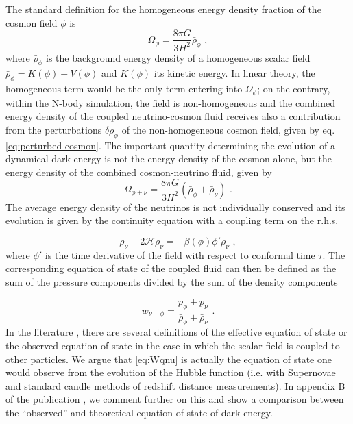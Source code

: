 The standard definition for the homogeneous energy density fraction
of the cosmon field $\phi$ is 
\begin{equation}
\Omega_{\phi}=\frac{8\pi G}{3H^{2}}\bar{\rho}_{\phi}\,\,,
\end{equation}
where $\bar{\rho}_{\phi}$ is the background energy density of a homogeneous
scalar field $\bar{\rho}_{\phi}=K(\phi)+V(\phi)$ and $K(\phi)$ its
kinetic energy. In linear theory, the homogeneous term would be the
only term entering into $\Omega_{\phi}$; on the contrary, within
the N-body simulation, the field is non-homogeneous and the combined
energy density of the coupled neutrino-cosmon fluid receives also
a contribution from the perturbations $\delta\rho_{\phi}$ of the
non-homogeneous cosmon field, given by eq.\ref{eq:perturbed-cosmon}.
The important quantity determining the evolution of a dynamical dark
energy is not the energy density of the cosmon alone, but the energy
density of the combined cosmon-neutrino fluid, given by 
\begin{equation}
\Omega_{\phi+\nu}=\frac{8\pi G}{3H^{2}}\left(\bar{\rho}_{\phi}+\bar{\rho}_{\nu}\right)\,\,.\label{eq:Omega-cosmon+nu}
\end{equation}
The average energy density of the neutrinos is not individually conserved
and its evolution is given by the continuity equation with a coupling
term on the r.h.s. \cite{ayaita_structure_2012,baldi_hydrodynamical_2010}

\begin{equation}
\rho_{\nu}+2\mathcal{H}\rho_{\nu}=-\beta(\phi)\phi'\rho_{\nu}\,\,,
\end{equation}
where $\phi'$ is the time derivative of the field with respect to
conformal time $\tau$. The corresponding equation of state of the
coupled fluid can then be defined as the sum of the pressure components
divided by the sum of the density components

\begin{equation}
w_{\nu+\phi}=\frac{\bar{p}_{\phi}+\bar{p}_{\nu}}{\bar{\rho}_{\phi}+\bar{\rho}_{\nu}}\,\,.\label{eq:Wqnu}
\end{equation}
In the literature \cite{brookfield_cosmology_2007,das_super-acceleration_2006,perrotta_extended_1999,perrotta_dark_2002},
there are several definitions of the effective equation of state or
the observed equation of state in the case in which the scalar field
is coupled to other particles. We argue that \cref{eq:Wqnu}
is actually the equation of state one would observe from the evolution
of the Hubble function (i.e. with Supernovae and standard candle methods
of redshift distance measurements). In appendix B of the publication \cite{casas_fitting_2015},
we comment further on this and show a comparison between the ``observed''
and theoretical equation of state of dark energy.

